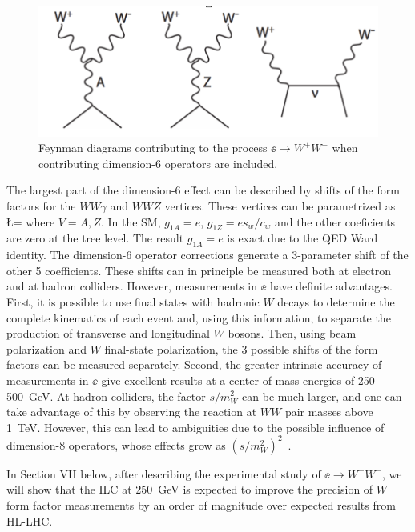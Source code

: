\begin{figure}
\begin{center}
\includegraphics[width=0.80\hsize]{chapters/figures/WWdiagrams.pdf}
\end{center}
\caption{Feynman diagrams contributing to the process $\ee\to W^+W^-$ when contributing  dimension-6 operators are included.}
\label{fig:eeWWdiagrams}
\end{figure}

The largest part of the dimension-6 effect can be described by shifts of the form 
factors for the $WW\gamma$ and $WWZ$ vertices.  These vertices can be parametrized as \cite{Hagiwara:1986vm}
\beq
\Delta \L = 
where $V = A,Z$.  In the SM, $g_{1A} = e$, $g_{1Z} = e s_w/c_w$ and the other coeficients are zero at the tree level.   The result $g_{1A} = e$ is exact due to the QED Ward identity.  The dimension-6 operator corrections generate a 3-parameter shift of the other 5 coefficients. These shifts can in principle be measured both at electron and at hadron colliders.  However, measurements in $\ee$ have  definite advantages.   First, it is possible to use final states with hadronic $W$ decays to determine the complete kinematics of each event and, using this information, to separate the production of 
transverse and longitudinal $W$ bosons.   Then, using beam polarization and $W$ final-state polarization, the 3 possible shifts of the form factors can be measured separately.   Second,  the greater intrinsic accuracy of measurements in $\ee$ give excellent results at a center of mass energies of 250--500~GeV.  At hadron colliders, 
the factor $s/m_W^2$ can be much larger, and one can take advantage of this by observing the reaction at $WW$ pair masses above 1~TeV.  However, this can lead to ambiguities due to the possible influence of dimension-8 operators, whose effects grow as $(s/m_W^2)^2$~\cite{Falkowski:2016cxu}. 

In Section VII  below, after describing the experimental study of $\ee\to W^+W^-$, we will show that the ILC at 250~GeV is expected to improve the precision of $W$ form factor measurements by an order of magnitude over expected results from HL-LHC.




